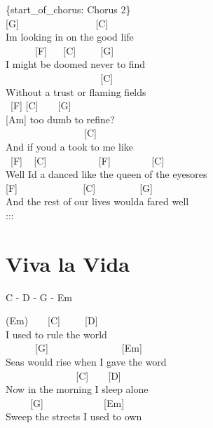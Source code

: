\documentclass[
  letterpaper,
]{scrbook}
\begin{document}
\{start\_of\_chorus: Chorus 2\}\\
{[}G{]} ~ ~ ~ ~ ~ ~ ~ ~ ~ {[}C{]}\\
I\textquotesingle m looking in on the good life\\
\hspace*{0.333em} ~ ~ ~ ~{[}F{]} ~ ~{[}C{]} ~ ~ ~{[}G{]}\\
I might be doomed never to find\\
\hspace*{0.333em} ~ ~ ~ ~ ~ ~ ~ ~ ~ ~ ~ ~{[}C{]}\\
Without a trust or flaming fields\\
\hspace*{0.333em} ~{[}F{]} {[}C{]} ~ ~ {[}G{]}\\
{[}Am{]} too dumb to refine?\\
\hspace*{0.333em} ~ ~ ~ ~ ~ ~ ~ ~ ~ ~{[}C{]}\\
And if you\textquotesingle d a took to me like\\
\hspace*{0.333em} ~{[}F{]} ~ {[}C{]} ~ ~ ~ ~ ~ ~ {[}F{]} ~ ~ ~ ~
~{[}C{]}\\
Well I\textquotesingle d a danced like the queen of the eyesores\\
{[}F{]} ~ ~ ~ ~ ~ ~ ~ ~{[}C{]} ~ ~ ~ ~ ~ {[}G{]}\\
And the rest of our lives would\textquotesingle a fared well\\
:::

\hypertarget{viva-la-vida}{%
\chapter{Viva la Vida}\label{viva-la-vida}}

C - D - G - Em

(Em) ~ ~ {[}C{]} ~ ~ ~{[}D{]}\\
I used to rule the world\\
\hspace*{0.333em} ~ ~ ~ ~{[}G{]} ~ ~ ~ ~ ~ ~ ~ ~ ~{[}Em{]}\\
Seas would rise when I gave the word\\
\hspace*{0.333em} ~ ~ ~ ~ ~ ~ ~ ~ ~{[}C{]} ~ ~ {[}D{]}\\
Now in the morning I sleep alone\\
\hspace*{0.333em} ~ ~ ~ {[}G{]} ~ ~ ~ ~ ~ ~ ~ {[}Em{]}\\
Sweep the streets I used to own
\end{document}
